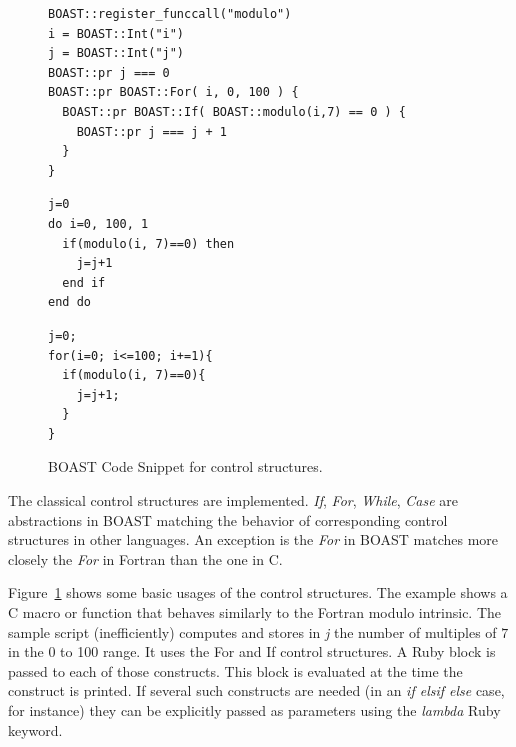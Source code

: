 \documentclass{IEEEtran}
\begin{document}
\begin{figure}
\begin{lstlisting}
BOAST::register_funccall("modulo")
i = BOAST::Int("i")
j = BOAST::Int("j")
BOAST::pr j === 0
BOAST::pr BOAST::For( i, 0, 100 ) {
  BOAST::pr BOAST::If( BOAST::modulo(i,7) == 0 ) {
    BOAST::pr j === j + 1
  }
}
\end{lstlisting}

\begin{minipage}[b]{0.47\linewidth}
\centering
{}

\begin{lstlisting}
j=0
do i=0, 100, 1
  if(modulo(i, 7)==0) then
    j=j+1
  end if
end do
\end{lstlisting}
\end{minipage}
\hspace{0.08\linewidth}
\begin{minipage}[b]{0.40\linewidth}
\centering
{}

\begin{lstlisting}
j=0;
for(i=0; i<=100; i+=1){
  if(modulo(i, 7)==0){
    j=j+1;
  }
}
\end{lstlisting}
\end{minipage}
\caption{BOAST Code Snippet for control structures.}
\label{fig:BOAST_control}
\end{figure}

The classical control structures are implemented. \emph{If}, \emph{For},
\emph{While}, \emph{Case} are abstractions in BOAST matching the behavior of
corresponding control structures in other languages. An exception is the
\emph{For} in BOAST matches more closely the \emph{For} in Fortran than the one
in C.

Figure~\ref{fig:BOAST_control} shows some basic usages of the control
structures.  The example shows a C macro or function that behaves similarly to
the Fortran modulo intrinsic. The sample script (inefficiently) computes and
stores in \emph{j} the number of multiples of $7$ in the 0 to 100 range. It
uses the For and If control structures. A Ruby block is passed to each of those
constructs. This block is evaluated at the time the construct is printed. If
several such constructs are needed (in an \emph{if elsif else} case, for
instance) they can be explicitly passed as parameters using the \emph{lambda}
Ruby keyword.
\end{document}
